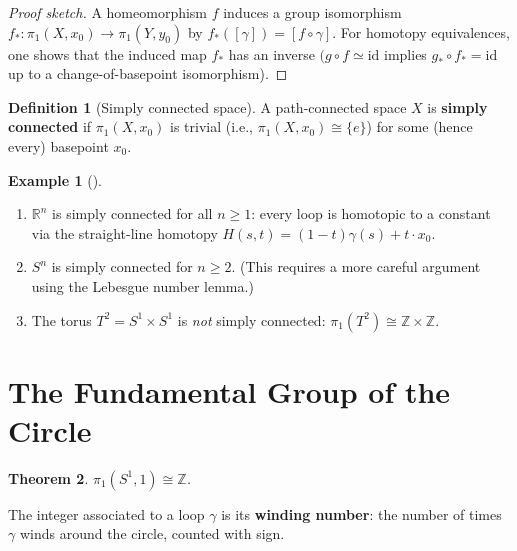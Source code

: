 \documentclass[11pt,a4paper,twoside]{book}
\newtheorem{theorem}{Theorem}[section]
\theoremstyle{remark}
\theoremstyle{definition}
\newtheorem{exampleplain}[theorem]{Example}
\theoremstyle{definition}
\newtheorem{definition}{Definition}[section]
\newenvironment{example}[1][]{%
  \begin{exampleplain}[#1]\itshape
}{%
  \end{exampleplain}
}
\begin{document}
\begin{proof}[Proof sketch]
A homeomorphism $f$ induces a group isomorphism $f_*\colon\pi_1(X,x_0)
\to\pi_1(Y,y_0)$ by $f_*([\gamma])=[f\circ\gamma]$.  For homotopy
equivalences, one shows that the induced map $f_*$ has an inverse
$(g\circ f\simeq\mathrm{id}$ implies $g_*\circ f_* = \mathrm{id}$
up to a change-of-basepoint isomorphism).
\end{proof}

\begin{definition}[Simply connected space]
\label{def:simply-connected}
A path-connected space $X$ is \textbf{simply connected} if
$\pi_1(X,x_0)$ is trivial (i.e., $\pi_1(X,x_0)\cong\{e\}$) for some
(hence every) basepoint $x_0$.
\end{definition}

\begin{example}
\label{ex:simply-connected}
\begin{enumerate}
  \item $\mathbb{R}^n$ is simply connected for all $n\ge 1$: every loop
        is homotopic to a constant via the straight-line homotopy
        $H(s,t)=(1-t)\gamma(s)+t\cdot x_0$.
  \item $S^n$ is simply connected for $n\ge 2$.  (This requires a more
        careful argument using the Lebesgue number lemma.)
  \item The torus $T^2=S^1\times S^1$ is \emph{not} simply connected:
        $\pi_1(T^2)\cong\mathbb{Z}\times\mathbb{Z}$.
\end{enumerate}
\end{example}

\section{The Fundamental Group of the Circle}
\label{sec:pi1-circle}

\begin{theorem}
\label{thm:pi1-circle}
$\pi_1(S^1, 1) \cong \mathbb{Z}$.
\end{theorem}

The integer associated to a loop $\gamma$ is its \textbf{winding
number}: the number of times $\gamma$ winds
around the circle, counted with sign.
\end{document}
